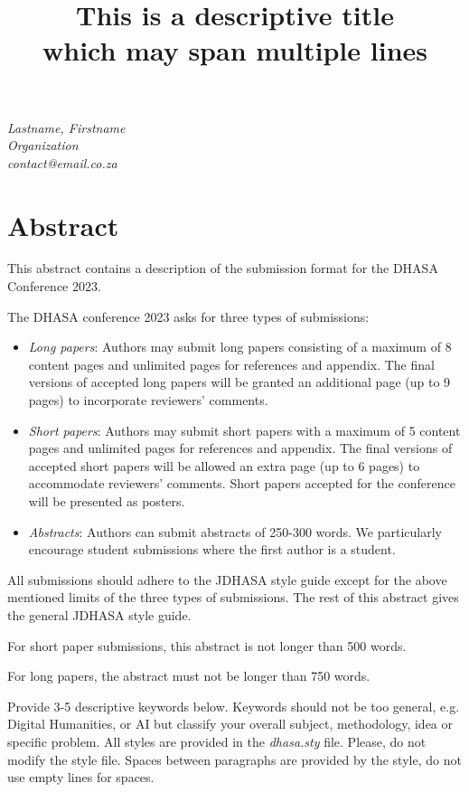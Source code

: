 \documentclass[12pt,a4paper,twoside, twocolumn]{article}
\begin{document}
\title*{This is a descriptive title\\which may span multiple lines}
\textit{Lastname, Firstname}\\
\textit{Organization} \\
\textit{contact@email.co.za} 

\section*{Abstract}
This abstract contains a description of the submission format for the DHASA Conference 2023.

The DHASA conference 2023 asks for three types of submissions:
\begin{itemize}
    \item \textit{Long papers}: Authors may submit long papers consisting of a maximum of 8 content pages and unlimited pages for references and appendix. The final versions of accepted long papers will be granted an additional page (up to 9 pages) to incorporate reviewers’ comments.
    \item \textit{Short papers}: Authors may submit short papers with a maximum of 5 content pages and unlimited pages for references and appendix. The final versions of accepted short papers will be allowed an extra page (up to 6 pages) to accommodate reviewers’ comments. Short papers accepted for the conference will be presented as posters.
    \item \textit{Abstracts}: Authors can submit abstracts of 250-300 words. We
    particularly encourage student submissions where the first author is a student.
\end{itemize}

All submissions should adhere to the JDHASA style guide except for the above mentioned limits of the three types of submissions. The rest of this abstract gives the general JDHASA style guide.

For short paper submissions, this abstract is not longer than 500 words. 

For long papers, the abstract must not be longer than 750 words. 
 
Provide 3-5 descriptive keywords below. Keywords should not be too general, e.g. Digital Humanities, or AI but classify your overall subject, methodology, idea or specific problem. All styles are provided in the \emph{dhasa.sty} file. Please, do not modify the style file.
Spaces between paragraphs are provided by the style, do not use empty lines for spaces. 
\end{document}
